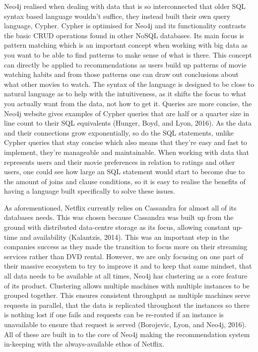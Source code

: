 \documentclass[a4paper]{article}
\begin{document}
Neo4j realised when dealing with data that is so interconnected that older SQL syntax based language wouldn't suffice, they instead built their own query language, Cypher. Cypher is optimised for Neo4j and its functionality contrasts the basic CRUD operations found in other NoSQL databases. Its main focus is pattern matching which is an important concept when working with big data as you want to be able to find patterns to make sense of what is there. This concept can directly be applied to recommendations as users build up patterns of movie watching habits and from those patterns one can draw out conclusions about what other movies to watch. The syntax of the language is designed to be close to natural language as to help with the intuitiveness, as it shifts the focus to what you actually want from the data, not how to get it. Queries are more concise, the Neo4j website gives examples of Cypher queries that are half or a quarter size in line count to their SQL equivalents (Hunger, Boyd, and Lyon, 2016). As the data and their connections grow exponentially, so do the SQL statements, unlike Cypher queries that stay concise which also means that they're easy and fast to implement, they're manageable and maintainable. When working with data that represents users and their movie preferences in relation to ratings and other users, one could see how large an SQL statement would start to become due to the amount of joins and clause conditions, so it is easy to realise the benefits of having a language built specifically to solve these issues. \par

As aforementioned, Netflix currently relies on Cassandra for almost all of its databases needs. This was chosen because Cassandra was built up from the ground with distributed data-centre storage as its focus, allowing constant up-time and availability (Kalantzis, 2014). This was an important step in the companies success as they made the transition to focus more on their streaming services rather than DVD rental. However, we are only focusing on one part of their massive ecosystem to try to improve it and to keep that same mindset, that all data needs to be available at all times, Neo4j has clustering as a core feature of its product. Clustering allows multiple machines with multiple instances to be grouped together. This ensures consistent throughput as multiple machines serve requests in parallel, that the data is replicated throughout the instances so there is nothing lost if one fails and requests can be re-routed if an instance is unavailable to ensure that request is served (Borojevic, Lyon, and Neo4j, 2016). All of these are built in to the core of Neo4j making the recommendation system in-keeping with the always-available ethos of Netflix. \par
\end{document}
